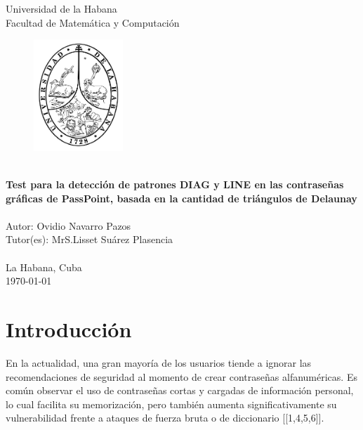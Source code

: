 \documentclass[12pt]{report}
\begin{document}
\begin{titlepage}
    \centering
    {\Huge {Universidad de la Habana}}\\[1cm]
    {\Huge {Facultad de Matemática y Computación }}\\[0.5cm]
 
    \begin{figure}[h]
    	\centering
    	\includegraphics[width=0.3\textwidth]{logoUH.png}
    \end{figure}
    {\noindent\hrulefill}\\[0.2cm]
    
    {\Large\textbf{{Test para la detección de patrones DIAG y LINE  en las contraseñas gráficas de PassPoint, basada en la cantidad de triángulos de Delaunay }}}\\[0.1cm]
    {\noindent\hrulefill}\\[1.0cm]
    
    
 
    
    {\Large {Autor: Ovidio Navarro Pazos}}\\[2cm]
   	{\Large {Tutor(es): MrS.Lisset Suárez Plasencia}}\\
   	\\[2.0cm]
   	
   	{\large{La Habana, Cuba}}\\
    {\large  \today}
\end{titlepage}

\tableofcontents
\newpage

\chapter*{Introducción}
\hypertarget{introduccion}{}


	En la actualidad, una gran mayoría de los usuarios tiende a ignorar las recomendaciones de seguridad al momento de crear contraseñas alfanuméricas. Es común observar el uso de contraseñas cortas y cargadas de información personal, lo cual facilita su memorización, pero también aumenta significativamente su vulnerabilidad frente a ataques de fuerza bruta o de diccionario [[1,4,5,6]].
	
\end{document}
